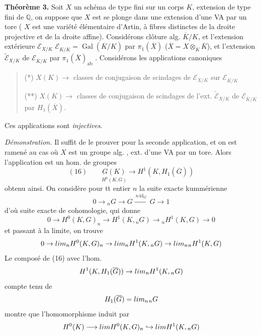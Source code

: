 \documentclass[11pt,a4paper]{article}
\begin{document}
\textbf{Théorème 3.} Soit $X$ un schéma de type fini sur un corps $K$, extension de type fini de $\mathbb{Q}$, on suppose que $X$ est   se plonge dans une extension d'une VA par un tore ( $X$ est une variété élémentaire d'Artin, à fibres   distinctes de la droite projective et de la droite affine). Considérons   clôture alg. $\overline{K}/K$, et l'extension extérieure  $\mathcal{E}_{X/K}$  $\mathcal{E}_{\overline{K}/K} = \operatorname{Gal}(\overline{K}/K)$ par $\pi_1(\overline{X})$ ($\overline{X} = X \otimes_K \overline{K}$), et l'extension $\widetilde{\mathcal{E}}_{X/K}$ de $\mathcal{E}_{\overline{K}/K}$ par $\pi_1(\overline{X})_{\mathrm{ab}}$ . Considérons les applications canoniques
\begin{quote}
(*) $X(K) \longrightarrow$ classes de conjugaison de scindages de $\mathcal{E}_{X/K}$ sur $\mathcal{E}_{\overline{K}/K}$

(**) $X(K) \longrightarrow$ classes de conjugaison de scindages de l'ext. $\widetilde{\mathcal{E}}_{X/K}$ de $\mathcal{E}_{\overline{K}/K}$ par $H_1(\overline{X})$.
\end{quote}



Ces applications sont \emph{injectives}.

\emph{Démonstration.} Il suffit de le prouver pour la seconde application, et on est ramené au cas où $X$ est  un groupe alg. , ext. d'une VA par un tore. Alors l'application est un hom. de groupes
\[
(16) \qquad \underset{H^0(K, G)}{G(K)} \longrightarrow H^1(K, H_1(\overline{G}))
\]
obtenu ainsi. On considère pour tt entier $n$ la suite exacte kummérienne
\[
0 \to {}_nG \to G \xrightarrow{\ n\,\mathrm{id}_G\ } G \to 1
\]
d'où suite exacte de cohomologie, qui donne
\[
0 \to H^0(K, G)_n \to H^1(K, {}_nG) \to {}_nH^1(K, G) \to 0
\]
et passant à la limite, on trouve
\[
0 \to \varprojlim_n H^0(K, G)_n \to \varprojlim_n H^1(K, {}_nG) \to \varprojlim_n {}_nH^1(K, G)
\]
Le composé de (16) avec l'hom. 
\[
H^1(K, H_1(\overline{G})) \to \varprojlim_n H^1(K, {}_nG)
\]
compte tenu de
\[
H_1(\overline{G}) = \varprojlim_n {}_nG
\]
montre que l'homomorphisme induit par
\[
H^0(K) \longrightarrow \varprojlim H^0(K, G)_n \hookrightarrow \varprojlim H^1(K, {}_nG)
\]
\end{document}
